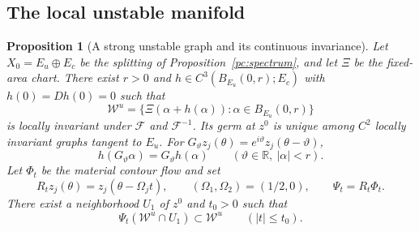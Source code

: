 \documentclass[11pt]{amsart}
\newtheorem{proposition}[theorem]{Proposition}
\theoremstyle{remark}
\numberwithin{equation}{section}
\newcommand{\R}{\mathbb R}
\begin{document}
\subsection{The local unstable manifold}
\label{subsec:unstable-manifold}

\begin{proposition}[A strong unstable graph and its continuous invariance]
\label{pc:unstable-graph}
Let $X_0=E_u\oplus E_c$ be the splitting of
Proposition~\ref{pc:spectrum}, and let $\Xi$ be the fixed-area chart.
There exist $r>0$ and
$h\in C^3(B_{E_u}(0,r);E_c)$ with $h(0)=Dh(0)=0$ such that
\[
 \mathcal W^u=\{\Xi(\alpha+h(\alpha)):\alpha\in B_{E_u}(0,r)\}
\]
is locally invariant under $\mathcal F$ and $\mathcal F^{-1}$.
Its germ at $z^0$ is unique among $C^2$ locally invariant graphs
tangent to $E_u$. For
$G_\vartheta z_j(\theta)=e^{i\vartheta}z_j(\theta-\vartheta)$,
\[
 h(G_\vartheta\alpha)=G_\vartheta h(\alpha)
 \qquad(\vartheta\in\R,\ |\alpha|<r).
\]
Let $\Phi_t$ be the material contour flow and set
\[
 R_tz_j(\theta)=z_j(\theta-\Omega_jt),\qquad
 (\Omega_1,\Omega_2)=(1/2,0),\qquad \Psi_t=R_t\Phi_t.
\]
There exist a neighborhood $U_1$ of $z^0$ and $t_0>0$ such that
\[
 \Psi_t(\mathcal W^u\cap U_1)\subset\mathcal W^u
 \qquad(|t|\le t_0).
\]
\end{proposition}
\end{document}
